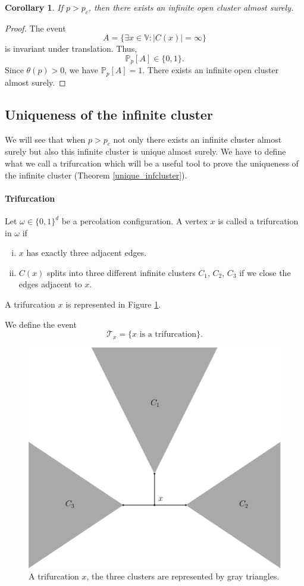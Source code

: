 \documentclass[a4paper,11pt]{article}
\theoremstyle{plain}
\newtheorem{corollary}[theorem]{Corollary}
\theoremstyle{definition}
\theoremstyle{remark}
\begin{document}
\begin{corollary}
If $p > p_c$, then there exists an infinite open cluster almost surely.
\end{corollary}
\begin{proof}
The event
\[A = \{\exists x \in \mathbb{V} : |C(x)| = \infty\}\] 
is invariant under translation. Thus,
\[\mathbb{P}_p[A] \in \{0,1\}.\]
Since $\theta(p) > 0$, we have $\mathbb{P}_p[A] = 1$. There exists an infinite open cluster almost surely.
\end{proof}

\subsection{Uniqueness of the infinite cluster}
We will see that when $p > p_c$ not only there exists an infinite cluster almost surely but also this infinite cluster is unique almost surely. We have to define what we call a trifurcation which will be a useful tool to prove the uniqueness of the infinite cluster (Theorem \ref{unique_infcluster}).
\paragraph{Trifurcation}
Let $\omega \in \{ 0, 1 \}^d$ be a percolation configuration. A vertex $x$ is called a trifurcation in $\omega$ if
\begin{enumerate}[(i)]
\item $x$ has exactly three adjacent edges.
\item $C(x)$ splits into three different infinite clusters $C_1$, $C_2$, $C_3$ if we close the edges adjacent to $x$.
\end{enumerate}
A trifurcation $x$ is represented in Figure \ref{fig:trif}.

We define the event
\[\mathscr{T}_x = \{x \text{ is a trifurcation}\}.\]

\begin{figure}
    \centering
    \includegraphics[scale=0.35]{trif.png}
    \caption{A trifurcation $x$, the three clusters are represented by gray triangles.}
    \label{fig:trif}
\end{figure}
\end{document}

